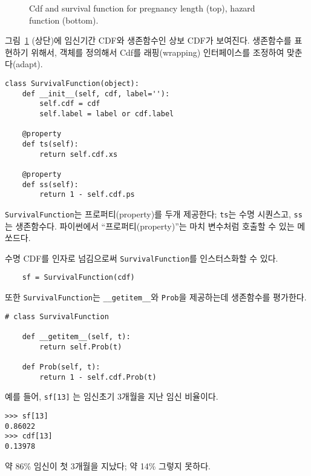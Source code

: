 \begin{figure}
\caption{Cdf and survival function for pregnancy length (top),
hazard function (bottom).}
\label{survival1}
\end{figure}

그림~\ref{survival1} (상단)에 임신기간 CDF와 생존함수인 상보 CDF가 보여진다. 생존함수를 표현하기 위해서, 객체를 정의해서 Cdf를 래핑(wrapping) 인터페이스를 조정하여 맞춘다(adapt).

\begin{verbatim}
class SurvivalFunction(object):
    def __init__(self, cdf, label=''):
        self.cdf = cdf
        self.label = label or cdf.label

    @property
    def ts(self):
        return self.cdf.xs

    @property
    def ss(self):
        return 1 - self.cdf.ps
\end{verbatim}

{\tt SurvivalFunction}는 프로퍼티(property)를 두개 제공한다; {\tt ts}는 수명 시퀀스고, {\tt ss}는 생존함수다.
파이썬에서 ``프로퍼티(property)''는 마치 변수처럼 호출할 수 있는 메쏘드다.

수명 CDF를 인자로 넘김으로써 {\tt SurvivalFunction}를 인스터스화할 수 있다.

\begin{verbatim}
    sf = SurvivalFunction(cdf)
\end{verbatim}

또한 {\tt SurvivalFunction}는 \verb"__getitem__"와 {\tt Prob}을 제공하는데 생존함수를 평가한다.

\begin{verbatim}
# class SurvivalFunction

    def __getitem__(self, t):
        return self.Prob(t)

    def Prob(self, t):
        return 1 - self.cdf.Prob(t)
\end{verbatim}

예를 들어, {\tt sf[13]} 는 임신초기 3개월을 지난 임신 비율이다.

\begin{verbatim}
>>> sf[13]
0.86022
>>> cdf[13]
0.13978
\end{verbatim}

약 86\% 임신이 첫 3개월을 지났다; 약 14\% 그렇지 못하다.

